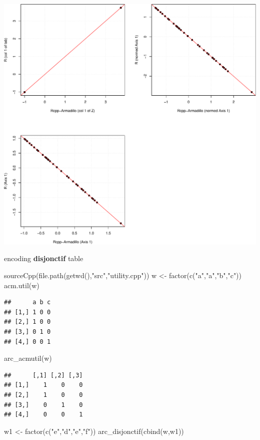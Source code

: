 \documentclass[
  10pt,
]{article}
\newenvironment{Shaded}{\begin{snugshade}}{\end{snugshade}}
\newcommand{\NormalTok}[1]{#1}
\begin{document}
\includegraphics{RandPytonAnalysisPDF_files/figure-latex/unnamed-chunk-65-1.pdf}

encoding \textbf{disjonctif} table

\begin{Shaded}
\begin{Highlighting}[]
\NormalTok{sourceCpp(file.path(getwd(),"src","utility.cpp"))}
\NormalTok{w \textless{}{-} factor(c("a","a","b","c"))}
\NormalTok{acm.util(w)}
\end{Highlighting}
\end{Shaded}

\begin{verbatim}
##      a b c
## [1,] 1 0 0
## [2,] 1 0 0
## [3,] 0 1 0
## [4,] 0 0 1
\end{verbatim}

\begin{Shaded}
\begin{Highlighting}[]
\NormalTok{arc\_acmutil(w)}
\end{Highlighting}
\end{Shaded}

\begin{verbatim}
##      [,1] [,2] [,3]
## [1,]    1    0    0
## [2,]    1    0    0
## [3,]    0    1    0
## [4,]    0    0    1
\end{verbatim}

\begin{Shaded}
\begin{Highlighting}[]
\NormalTok{w1 \textless{}{-} factor(c("e","d","e","f"))}
\NormalTok{arc\_disjonctif(cbind(w,w1))}
\end{Highlighting}
\end{Shaded}
\end{document}
